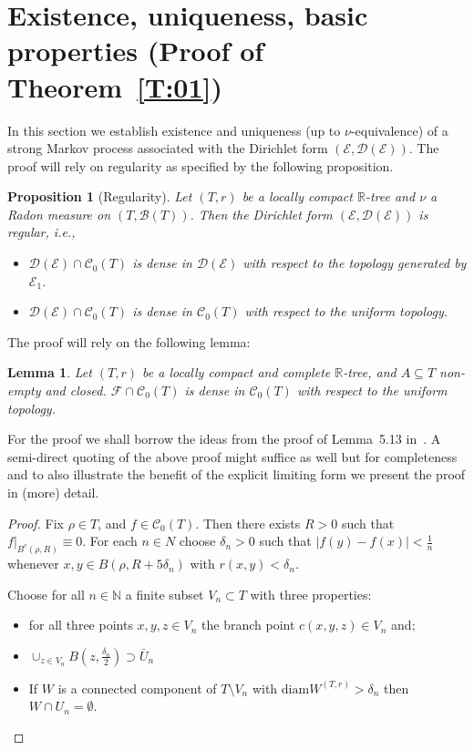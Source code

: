 \documentclass[11pt]{amsart}
\numberwithin{equation}{section}
\newtheorem{lemma}[definition]{Lemma}
\newtheorem{proposition}[definition]{Proposition}
\begin{document}
{\section{Existence, uniqueness, basic properties (Proof of Theorem~\ref{T:01})}
\label{S:existence}
In this section we establish existence and uniqueness (up to $\nu$-equivalence) of a strong Markov process associated with the Dirichlet form $({\mathcal E},{\mathcal D}({\mathcal E}))$.
The proof will rely on regularity as specified by the following proposition.
{\begin{proposition}[Regularity]
Let $(T,r)$ be a locally compact ${{\mathbb R}}$-tree
and $\nu$ a Radon measure on $(T,{\mathcal B}(T))$. 
Then the Dirichlet form $({\mathcal E},{\mathcal D}({\mathcal E}))$ is {{\it} regular}, i.e.,
\begin{itemize}
\item[(i)] ${\mathcal D}({\mathcal E})\cap {\mathcal C}_0(T)$ is dense in ${\mathcal D}({\mathcal E})$ with respect to the topology generated by ${\mathcal E}_1$.
\item[(ii)] ${\mathcal D}({\mathcal E})\cap {\mathcal C}_0(T)$ is dense in ${\mathcal C}_0(T)$ with respect to the uniform topology.
\end{itemize}
\label{L:04}
\end{proposition}{\smallskip}

The proof will rely on the following lemma:

\begin{lemma} Let $(T,r)$ be a locally compact and complete ${{\mathbb R}}$-tree, and $A\subseteq T$ non-empty and closed.
${\mathcal F}\cap {\mathcal C}_0(T)$ is dense in ${\mathcal C}_0(T)$ with respect to the uniform topology.
\label{L:09}
\end{lemma}}{\smallskip}

For the proof we shall borrow the ideas from the proof of Lemma~5.13 in~\cite{Kigami95}.  A semi-direct quoting of the above proof might suffice as well but for completeness and to also illustrate the benefit of the explicit limiting form we present the proof in (more) detail.

\begin{proof}
Fix $\rho\in T$, and $f\in {\mathcal C}_0(T)$. Then there exists $R>0$ such that $f\big|_{B^c(\rho,R)}\equiv 0$. For each $n\in N$ choose $\delta_n>0$ such that
$|f(y)-f(x)|<\tfrac{1}{n}$ whenever $x,y\in B(\rho,R+5\delta_n)$ with $r(x,y)<\delta_n.$

Choose for all $n\in{{\mathbb N}}$ a finite subset $V_{n} \subset T$ with three properties:
\begin{itemize}
\item[(i)] for all three points $x,y,z\in V_n$ the branch point $c(x,y,z)\in {V_n}$ and;
\item[(ii)] $\cup_{z \in V_{n}}  B(z, \frac{\delta_{n}}{2}) \supset \bar{U}_{n}$
\item[(iii)] If $W$ is a connected component of $T\setminus V_n$ with $\mbox{diam}{W}^{(T,r)} > \delta_{n}$ then $W \cap U_{n} =\emptyset$.
\end{itemize}


\end{proof}}
\end{document}
